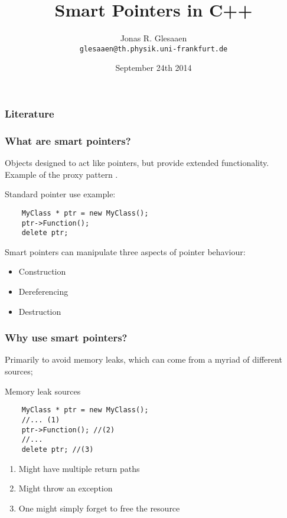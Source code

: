 \documentclass[11pt,a4paper,dvipsnames,usenames]{beamer}
\title[Smart Pointers]{Smart Pointers in C++}
\author{Jonas R. Glesaaen \\ \texttt{glesaaen@th.physik.uni-frankfurt.de}}
\date{September 24th 2014}
\begin{document}
\nocite{*}

\begin{frame}
  \titlepage
\end{frame}

\begin{frame}
  \frametitle{Literature}
  
  {\footnotesize
    }
\end{frame}

\begin{frame}[fragile]
  \frametitle{What are smart pointers?}

  Objects designed to act like pointers, but provide extended functionality. 
  Example of the proxy pattern \cite{patterns}. 

  \vfill

  \begin{exampleblock}{Standard pointer use example:}
    \begin{lstlisting}
    MyClass * ptr = new MyClass();
    ptr->Function();
    delete ptr;
    \end{lstlisting}
  \end{exampleblock}

  \vfill

  Smart pointers can manipulate three aspects of pointer behaviour:

  \begin{itemize}
    \item Construction
    \item Dereferencing
    \item Destruction
  \end{itemize}

\end{frame}

\begin{frame}[fragile]
  \frametitle{Why use smart pointers?}

  \vfill

  Primarily to avoid memory leaks, which can come from a myriad of different sources;

  \vfill

  \begin{exampleblock}{Memory leak sources}
    \begin{lstlisting}
    MyClass * ptr = new MyClass();
    //... (1)
    ptr->Function(); //(2)
    //...
    delete ptr; //(3)
    \end{lstlisting}
  \end{exampleblock}

  \vfill

  \begin{enumerate}
    \item Might have multiple return paths
    \item Might throw an exception
    \item One might simply forget to free the resource
  \end{enumerate}
  
  \vfill


\end{frame}
\end{document}
